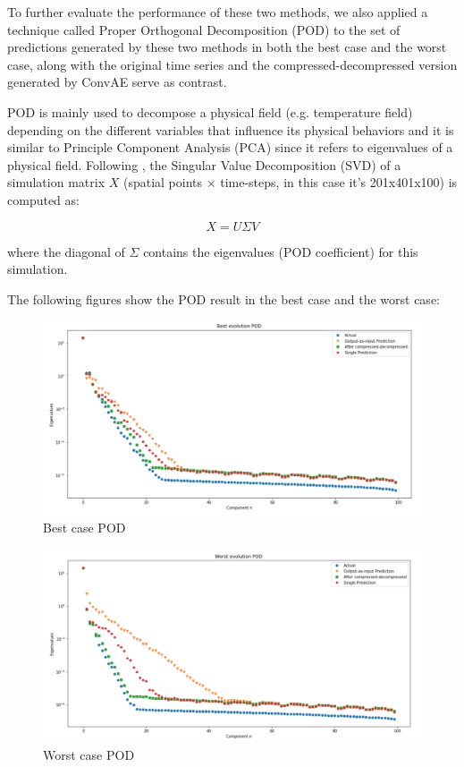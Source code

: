 To further evaluate the performance of these two methods, we also applied a technique called Proper Orthogonal Decomposition (POD) to the set of predictions generated by these two methods in both the best case and the worst case, along with the original time series and the compressed-decompressed version generated by ConvAE serve as contrast.

POD is mainly used to decompose a physical field (e.g. temperature field) depending on the different variables that influence its physical behaviors and it is similar to Principle Component Analysis (PCA) since it refers to eigenvalues of a physical field.\citep{10.1146_annurev.fl.25.010193.002543} Following \citep{10.1515_9783110671490-007}, the Singular Value Decomposition (SVD) of a simulation matrix $X$ (spatial points × time-steps, in this case it's 201x401x100) is computed as:

\begin{equation}
X = U\Sigma V
\end{equation}

where the diagonal of $\Sigma$ contains the eigenvalues (POD coefficient) for this simulation.

The following figures show the POD result in the best case and the worst case:

\begin{figure}[H]
    \caption{Best case POD}
    \includegraphics[scale=0.5]{Report LaTeX/figures/mantle_convection_images/limited_dataset/FNN_Best_POD.png}
\end{figure}

\begin{figure}[H]
    \caption{Worst case POD}
    \includegraphics[scale=0.5]{Report LaTeX/figures/mantle_convection_images/limited_dataset/FNN_Worst_POD.png}
\end{figure}

